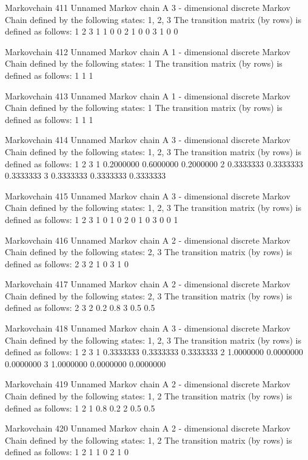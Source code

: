 \documentclass[
  nojss]{jss}
\begin{document}
\begin{CodeChunk}
\begin{CodeOutput}
Markovchain  411 
Unnamed Markov chain 
 A  3 - dimensional discrete Markov Chain defined by the following states: 
 1, 2, 3 
 The transition matrix  (by rows)  is defined as follows: 
  1 2 3
1 1 0 0
2 1 0 0
3 1 0 0

Markovchain  412 
Unnamed Markov chain 
 A  1 - dimensional discrete Markov Chain defined by the following states: 
 1 
 The transition matrix  (by rows)  is defined as follows: 
  1
1 1

Markovchain  413 
Unnamed Markov chain 
 A  1 - dimensional discrete Markov Chain defined by the following states: 
 1 
 The transition matrix  (by rows)  is defined as follows: 
  1
1 1

Markovchain  414 
Unnamed Markov chain 
 A  3 - dimensional discrete Markov Chain defined by the following states: 
 1, 2, 3 
 The transition matrix  (by rows)  is defined as follows: 
          1         2         3
1 0.2000000 0.6000000 0.2000000
2 0.3333333 0.3333333 0.3333333
3 0.3333333 0.3333333 0.3333333

Markovchain  415 
Unnamed Markov chain 
 A  3 - dimensional discrete Markov Chain defined by the following states: 
 1, 2, 3 
 The transition matrix  (by rows)  is defined as follows: 
  1 2 3
1 0 1 0
2 0 1 0
3 0 0 1

Markovchain  416 
Unnamed Markov chain 
 A  2 - dimensional discrete Markov Chain defined by the following states: 
 2, 3 
 The transition matrix  (by rows)  is defined as follows: 
  2 3
2 1 0
3 1 0

Markovchain  417 
Unnamed Markov chain 
 A  2 - dimensional discrete Markov Chain defined by the following states: 
 2, 3 
 The transition matrix  (by rows)  is defined as follows: 
    2   3
2 0.2 0.8
3 0.5 0.5

Markovchain  418 
Unnamed Markov chain 
 A  3 - dimensional discrete Markov Chain defined by the following states: 
 1, 2, 3 
 The transition matrix  (by rows)  is defined as follows: 
          1         2         3
1 0.3333333 0.3333333 0.3333333
2 1.0000000 0.0000000 0.0000000
3 1.0000000 0.0000000 0.0000000

Markovchain  419 
Unnamed Markov chain 
 A  2 - dimensional discrete Markov Chain defined by the following states: 
 1, 2 
 The transition matrix  (by rows)  is defined as follows: 
    1   2
1 0.8 0.2
2 0.5 0.5

Markovchain  420 
Unnamed Markov chain 
 A  2 - dimensional discrete Markov Chain defined by the following states: 
 1, 2 
 The transition matrix  (by rows)  is defined as follows: 
  1 2
1 1 0
2 1 0


\end{CodeOutput}
\end{CodeChunk}
\end{document}
